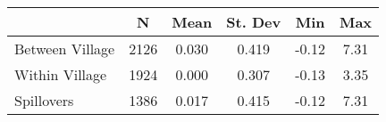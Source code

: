 \begin{tabular}{l*{5}{c}}\hline&\multicolumn{1}{c}{N}&\multicolumn{1}{c}{Mean}&\multicolumn{1}{c}{St. Dev}&\multicolumn{1}{c}{Min}&\multicolumn{1}{c}{Max}\\ \hline 
Between Village & 2126 & 0.030 & 0.419 & -0.12 & 7.31 \\
Within Village & 1924 & 0.000 & 0.307 & -0.13 & 3.35 \\
Spillovers & 1386 & 0.017 & 0.415 & -0.12 & 7.31 \\
\hline \end{tabular}
